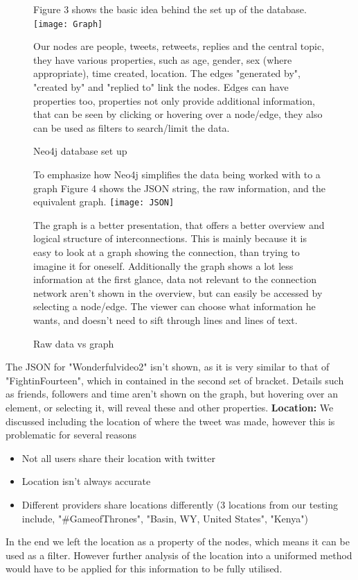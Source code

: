 \documentclass[11pt]{article}
\begin{document}
\begin{figure}
Figure 3 shows the basic idea behind the set up of the database.\newline
\texttt{[image: Graph]}\newline
\caption{Neo4j database set up} 
\label{fig: 3}
Our nodes are people, tweets, retweets, replies and the central topic, they have various properties, such as age, gender, sex (where appropriate), time created, location.
The edges "generated by", "created by" and "replied to" link the nodes. Edges can have properties too, properties not only provide additional information, that can be seen by clicking or hovering over a node/edge, they also can be used as filters to search/limit the data.
\end{figure}

\begin{figure}
To emphasize how Neo4j simplifies the data being worked with to a graph Figure 4 shows the JSON string, the raw information, and the equivalent graph.\newline
\texttt{[image: JSON]}\newline
\caption{Raw data vs graph} 
\label{fig: 4}
The graph is a better presentation, that offers a better overview and logical structure of interconnections. This is mainly because it is easy to look at a graph showing the connection, than trying to imagine it for oneself.\newline
Additionally the graph shows a lot less information at the first glance, data not relevant to the connection network aren't shown in the overview, but can easily be accessed by selecting a node/edge. The viewer can choose what information he wants, and doesn't need to sift through lines and lines of text.

\end{figure}
The JSON for "Wonderfulvideo2" isn't shown, as it is very similar to that of "FightinFourteen", which in contained in the second set of bracket{}.
Details such as friends, followers and time aren't shown on the graph, but hovering over an element, or selecting it, will reveal these and other properties.
\newline
\newline
\textbf{Location:} We discussed including the location of where the tweet was made, however this is problematic for several reasons
\begin{itemize}
\item Not all users share their location with twitter
\item Location isn't always accurate
\item Different providers share locations differently (3 locations from our testing include, "\#GameofThrones", "Basin, WY, United States", "Kenya")
\end{itemize}
In the end we left the location as a property of the nodes, which means it can be used as a filter. However further analysis of the location into a uniformed method would have to be applied for this information to be fully utilised.\newline
\end{document}
